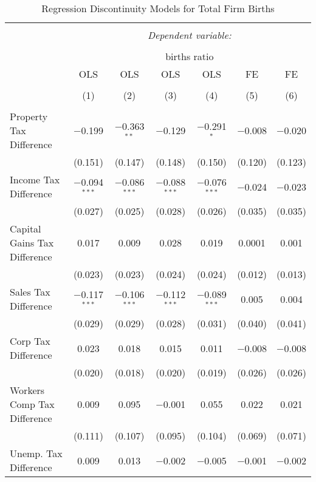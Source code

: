 
\begin{table}[!htbp] \centering 
  \caption{Regression Discontinuity Models for  Total Firm Births} 
  \label{--rd} 
\footnotesize 
\begin{tabular}{@{\extracolsep{5pt}}lcccccc} 
\\[-1.8ex]\hline 
\hline \\[-1.8ex] 
 & \multicolumn{6}{c}{\textit{Dependent variable:}} \\ 
\cline{2-7} 
\\[-1.8ex] & \multicolumn{6}{c}{births ratio} \\ 
 & OLS & OLS & OLS & OLS & FE & FE \\ 
\\[-1.8ex] & (1) & (2) & (3) & (4) & (5) & (6)\\ 
\hline \\[-1.8ex] 
 Property Tax Difference & $-$0.199 & $-$0.363$^{**}$ & $-$0.129 & $-$0.291$^{*}$ & $-$0.008 & $-$0.020 \\ 
  & (0.151) & (0.147) & (0.148) & (0.150) & (0.120) & (0.123) \\ 
  Income Tax Difference & $-$0.094$^{***}$ & $-$0.086$^{***}$ & $-$0.088$^{***}$ & $-$0.076$^{***}$ & $-$0.024 & $-$0.023 \\ 
  & (0.027) & (0.025) & (0.028) & (0.026) & (0.035) & (0.035) \\ 
  Capital Gains Tax Difference & 0.017 & 0.009 & 0.028 & 0.019 & 0.0001 & 0.001 \\ 
  & (0.023) & (0.023) & (0.024) & (0.024) & (0.012) & (0.013) \\ 
  Sales Tax Difference & $-$0.117$^{***}$ & $-$0.106$^{***}$ & $-$0.112$^{***}$ & $-$0.089$^{***}$ & 0.005 & 0.004 \\ 
  & (0.029) & (0.029) & (0.028) & (0.031) & (0.040) & (0.041) \\ 
  Corp Tax Difference & 0.023 & 0.018 & 0.015 & 0.011 & $-$0.008 & $-$0.008 \\ 
  & (0.020) & (0.018) & (0.020) & (0.019) & (0.026) & (0.026) \\ 
  Workers Comp Tax Difference & 0.009 & 0.095 & $-$0.001 & 0.055 & 0.022 & 0.021 \\ 
  & (0.111) & (0.107) & (0.095) & (0.104) & (0.069) & (0.071) \\ 
  Unemp. Tax Difference & 0.009 & 0.013 & $-$0.002 & $-$0.005 & $-$0.001 & $-$0.002 \\ 

\end{tabular}
\end{table}
